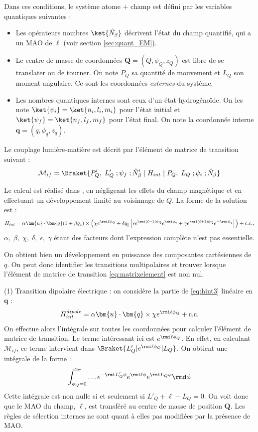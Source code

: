 Dans ces conditions, le système {atome + champ} est défini par les variables quantiques suivantes :
\begin{itemize}
\renewcommand{\labelitemi}{$\bullet$}
\setlength\itemsep{1em}
\item Les opérateurs nombres $\ket{\hat{N}_{\beta}}$ décrivent l'état du champ quantifié, qui a un MAO de $\ell$ (voir section \ref{sec:quant_EM}). 
\item Le centre de masse de coordonnées $\bm{Q}=(Q,\phi_Q,z_Q)$ est libre de se translater ou de tourner. On note $P_Q$ sa quantité de mouvement et $L_Q$ son moment angulaire. Ce sont les coordonnées \textit{externes} du système.
\item Les nombres quantiques internes sont ceux d'un état hydrogénoïde. On les note $\ket{\psi_i}=\ket{n_i,l_i,m_i}$ pour l'état initial et $\ket{\psi_f}=\ket{n_f,l_f,m_f}$ pour l'état final. On note la coordonnée interne $\bm{q} = (q,\phi_q,z_q)$.
\end{itemize}


Le couplage lumière-matière est décrit par l'élément de matrice de transition suivant :
\begin{equation}
\mathcal{M}_{if}=\Braket{P'_Q,\;L'_Q\; ;\psi_f\; ;\hat{N}'_{\beta}\;|\;H_{int}\;|\;P_Q,\;L_Q\; ;\psi_i\; ;\hat{N}_{\beta}}
\label{eq:matrixelement}
\end{equation}

Le calcul est réalisé dans , en négligeant les effets du champ magnétique et en effectuant un développement limité au voisinnage de $Q$. La forme de la solution est :
\begin{equation}
H_{int} = \alpha\bm{u}\cdot\bm{q}(1+\beta q_z)\times\left(\chi e^{\rmi\ell\phi_Q}+\delta q_{\parallel}\left[\epsilon e^{\rmi(\ell-1)\phi_Q}e^{\rmi \phi_q}+\gamma e^{\rmi(\ell+1)\phi_Q}e^{-\rmi \phi_q}\right]\right)+\text{c.c.},
\label{eq:hint3}
\end{equation}
$\alpha,\;\beta,\;\chi,\;\delta,\;\epsilon,\;\gamma$ étant des facteurs dont l'expression complète n'est pas essentielle.

On obtient bien un développement en puissance des composantes cartésiennes de $q$. On peut donc identifier les transitions multipolaires et trouver lorsque l'élément de matrice de transition \ref{eq:matrixelement} est non nul.

(1) Transition dipolaire électrique : on considère la partie de \ref{eq:hint3} linéaire en $\bm{q}$ : 
\[H^{dipole}_{int} = \alpha\bm{u}\cdot\bm{q}\times\chi e^{\rmi\ell\phi_Q}+\text{c.c.}\]
On effectue alors l'intégrale sur toutes les coordonnées pour calculer l'élément de matrice de transition. Le terme intéressant ici est $e^{\rmi\ell\phi_Q}$. En effet, en calculant $\mathcal{M}_{if}$, ce terme intervient dans $\Braket{L'_Q|e^{\rmi\ell\phi_Q}|L_Q}$. On obtient une intégrale de la forme :
\[\int_{\phi_Q=0}^{2\pi} \ldots e^{-\rmi L'_Q\phi}e^{\rmi\ell\phi}e^{\rmi L_Q\phi} \rmd\phi\]
Cette intégrale est non nulle si et seulement si $L'_Q+\ell-L_Q=0$. On voit donc que le MAO du champ, $\ell$, est transféré au centre de masse de position $\bm{Q}$. Les règles de sélection internes ne sont quant à elles pas modifiées par la présence de MAO.

